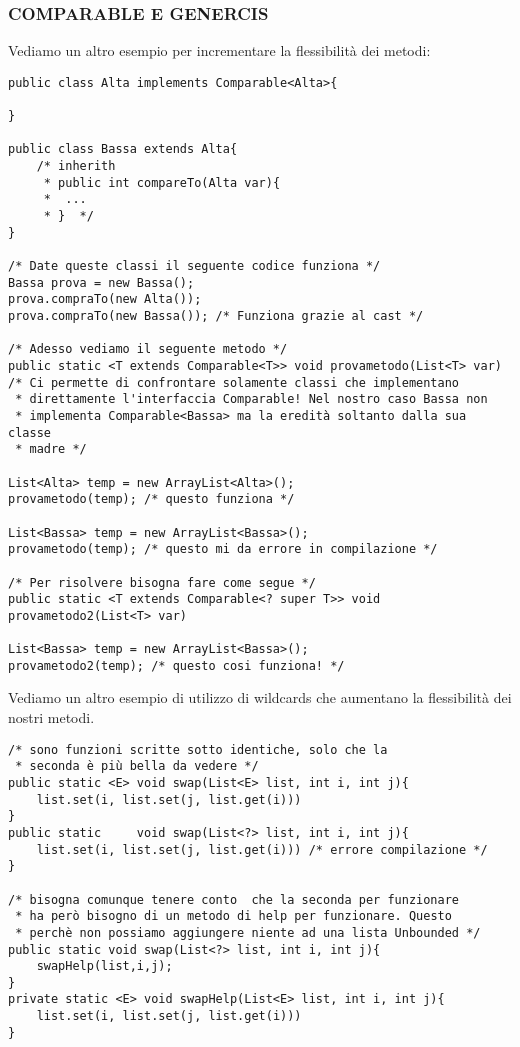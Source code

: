 \subsubsection{COMPARABLE E GENERCIS}
\noindent Vediamo un altro esempio per incrementare la flessibilità dei metodi:
\begin{lstlisting}
public class Alta implements Comparable<Alta>{

}

public class Bassa extends Alta{
	/* inherith
	 * public int compareTo(Alta var){
	 *	...
	 * }  */
}

/* Date queste classi il seguente codice funziona */
Bassa prova = new Bassa();
prova.compraTo(new Alta());
prova.compraTo(new Bassa()); /* Funziona grazie al cast */

/* Adesso vediamo il seguente metodo */
public static <T extends Comparable<T>> void provametodo(List<T> var)
/* Ci permette di confrontare solamente classi che implementano
 * direttamente l'interfaccia Comparable! Nel nostro caso Bassa non
 * implementa Comparable<Bassa> ma la eredità soltanto dalla sua classe 
 * madre */

List<Alta> temp = new ArrayList<Alta>();
provametodo(temp); /* questo funziona */

List<Bassa> temp = new ArrayList<Bassa>();
provametodo(temp); /* questo mi da errore in compilazione */

/* Per risolvere bisogna fare come segue */ 
public static <T extends Comparable<? super T>> void provametodo2(List<T> var)

List<Bassa> temp = new ArrayList<Bassa>();
provametodo2(temp); /* questo cosi funziona! */
\end{lstlisting}

\noindent Vediamo un altro esempio di utilizzo di wildcards che aumentano la flessibilità dei nostri metodi.
\begin{lstlisting}
/* sono funzioni scritte sotto identiche, solo che la 
 * seconda è più bella da vedere */
public static <E> void swap(List<E> list, int i, int j){
	list.set(i, list.set(j, list.get(i)))
}
public static     void swap(List<?> list, int i, int j){
	list.set(i, list.set(j, list.get(i))) /* errore compilazione */
}

/* bisogna comunque tenere conto  che la seconda per funzionare
 * ha però bisogno di un metodo di help per funzionare. Questo
 * perchè non possiamo aggiungere niente ad una lista Unbounded */
public static void swap(List<?> list, int i, int j){
	swapHelp(list,i,j);
}
private static <E> void swapHelp(List<E> list, int i, int j){
	list.set(i, list.set(j, list.get(i)))
}
\end{lstlisting}

